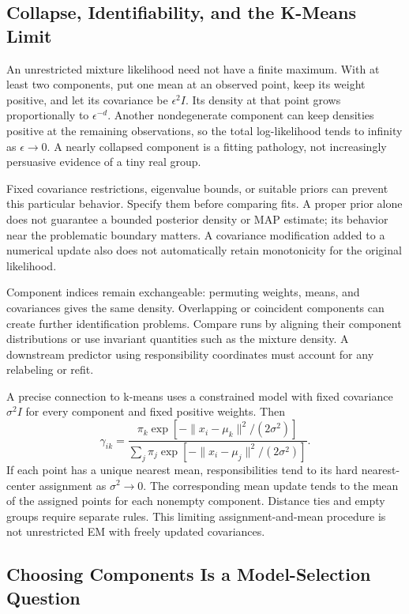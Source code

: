\subsection{Collapse, Identifiability, and the K-Means Limit}

An unrestricted mixture likelihood need not have a finite maximum. With at least two components, put one mean at an observed point, keep its weight positive, and let its covariance be $\epsilon^2I$. Its density at that point grows proportionally to $\epsilon^{-d}$. Another nondegenerate component can keep densities positive at the remaining observations, so the total log-likelihood tends to infinity as $\epsilon\to0$. A nearly collapsed component is a fitting pathology, not increasingly persuasive evidence of a tiny real group.

Fixed covariance restrictions, eigenvalue bounds, or suitable priors can prevent this particular behavior. Specify them before comparing fits. A proper prior alone does not guarantee a bounded posterior density or MAP estimate; its behavior near the problematic boundary matters. A covariance modification added to a numerical update also does not automatically retain monotonicity for the original likelihood.

Component indices remain exchangeable: permuting weights, means, and covariances gives the same density. Overlapping or coincident components can create further identification problems. Compare runs by aligning their component distributions or use invariant quantities such as the mixture density. A downstream predictor using responsibility coordinates must account for any relabeling or refit.

A precise connection to k-means uses a constrained model with fixed covariance $\sigma^2I$ for every component and fixed positive weights. Then
\[
\gamma_{ik}=\frac{\pi_k\exp[-\|x_i-\mu_k\|^2/(2\sigma^2)]}
{\sum_j\pi_j\exp[-\|x_i-\mu_j\|^2/(2\sigma^2)]}.
\]
If each point has a unique nearest mean, responsibilities tend to its hard nearest-center assignment as $\sigma^2\to0$. The corresponding mean update tends to the mean of the assigned points for each nonempty component. Distance ties and empty groups require separate rules. This limiting assignment-and-mean procedure is not unrestricted EM with freely updated covariances.

\subsection{Choosing Components Is a Model-Selection Question}

